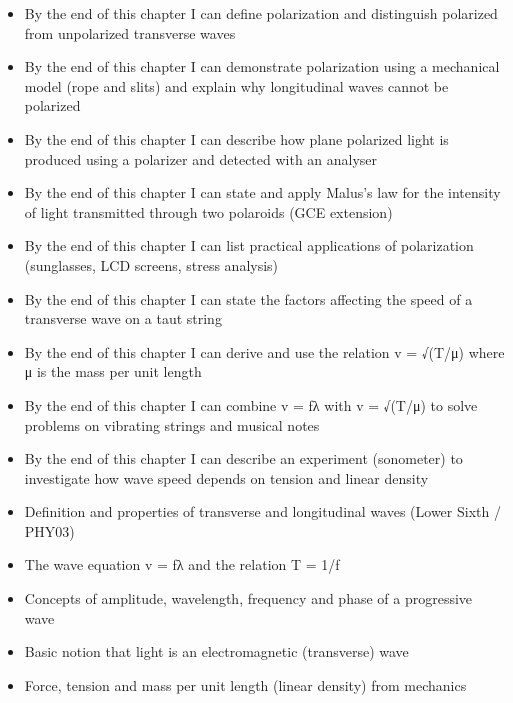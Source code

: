 \documentclass[11pt]{article}
\begin{document}
\begin{objectifs}
\begin{itemize}
\item By the end of this chapter I can define polarization and distinguish polarized from unpolarized transverse waves
\item By the end of this chapter I can demonstrate polarization using a mechanical model (rope and slits) and explain why longitudinal waves cannot be polarized
\item By the end of this chapter I can describe how plane polarized light is produced using a polarizer and detected with an analyser
\item By the end of this chapter I can state and apply Malus's law for the intensity of light transmitted through two polaroids (GCE extension)
\item By the end of this chapter I can list practical applications of polarization (sunglasses, LCD screens, stress analysis)
\item By the end of this chapter I can state the factors affecting the speed of a transverse wave on a taut string
\item By the end of this chapter I can derive and use the relation v = √(T/μ) where μ is the mass per unit length
\item By the end of this chapter I can combine v = fλ with v = √(T/μ) to solve problems on vibrating strings and musical notes
\item By the end of this chapter I can describe an experiment (sonometer) to investigate how wave speed depends on tension and linear density
\end{itemize}
\end{objectifs}

\begin{prerequis}
\begin{itemize}
\item Definition and properties of transverse and longitudinal waves (Lower Sixth / PHY03)
\item The wave equation v = fλ and the relation T = 1/f
\item Concepts of amplitude, wavelength, frequency and phase of a progressive wave
\item Basic notion that light is an electromagnetic (transverse) wave
\item Force, tension and mass per unit length (linear density) from mechanics
\end{itemize}
\end{prerequis}
\end{document}
